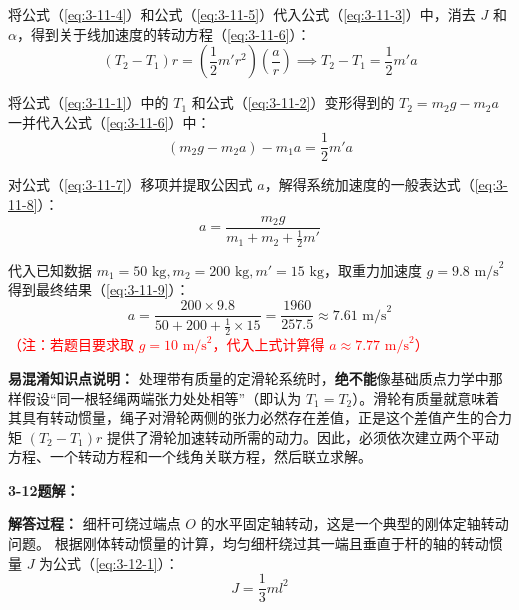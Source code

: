 将公式（\ref{eq:3-11-4}）和公式（\ref{eq:3-11-5}）代入公式（\ref{eq:3-11-3}）中，消去 $J$ 和 $\alpha$，得到关于线加速度的转动方程（\ref{eq:3-11-6}）：
\begin{equation}\label{eq:3-11-6}
	(T_2 - T_1)r = \left(\frac{1}{2}m'r^2\right) \left(\frac{a}{r}\right) \implies T_2 - T_1 = \frac{1}{2}m'a
\end{equation}

将公式（\ref{eq:3-11-1}）中的 $T_1$ 和公式（\ref{eq:3-11-2}）变形得到的 $T_2 = m_2 g - m_2 a$ 一并代入公式（\ref{eq:3-11-6}）中：
\begin{equation}\label{eq:3-11-7}
	(m_2 g - m_2 a) - m_1 a = \frac{1}{2}m'a
\end{equation}

对公式（\ref{eq:3-11-7}）移项并提取公因式 $a$，解得系统加速度的一般表达式（\ref{eq:3-11-8}）：
\begin{equation}\label{eq:3-11-8}
	a = \frac{m_2 g}{m_1 + m_2 + \frac{1}{2}m'}
\end{equation}

代入已知数据 $m_1 = 50\text{ kg}, m_2 = 200\text{ kg}, m' = 15\text{ kg}$，取重力加速度 $g = 9.8\text{ m/s}^2$ 得到最终结果（\ref{eq:3-11-9}）：
\begin{equation}\label{eq:3-11-9}
	a = \frac{200 \times 9.8}{50 + 200 + \frac{1}{2} \times 15} = \frac{1960}{257.5} \approx 7.61 \text{ m/s}^2
\end{equation}
\textcolor{red}{（注：若题目要求取 $g = 10\text{ m/s}^2$，代入上式计算得 $a \approx 7.77\text{ m/s}^2$）}

\vspace{1em}

\textbf{易混淆知识点说明：}
处理带有质量的定滑轮系统时，\textbf{绝不能}像基础质点力学中那样假设“同一根轻绳两端张力处处相等”（即认为 $T_1 = T_2$）。滑轮有质量就意味着其具有转动惯量，绳子对滑轮两侧的张力必然存在差值，正是这个差值产生的合力矩 $(T_2 - T_1)r$ 提供了滑轮加速转动所需的动力。因此，必须依次建立两个平动方程、一个转动方程和一个线角关联方程，然后联立求解。

\vspace{2em}

\textbf{3-12题解：}
\setcounter{equation}{0}
\renewcommand{\theHequation}{3-12.\arabic{equation}}

\textbf{解答过程：}
细杆可绕过端点 $O$ 的水平固定轴转动，这是一个典型的刚体定轴转动问题。
根据刚体转动惯量的计算，均匀细杆绕过其一端且垂直于杆的轴的转动惯量 $J$ 为公式（\ref{eq:3-12-1}）：
\begin{equation}\label{eq:3-12-1}
	J = \frac{1}{3}ml^2
\end{equation}

